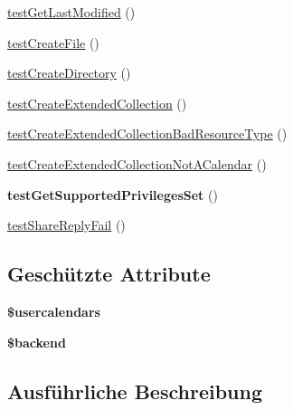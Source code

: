 \begin{DoxyCompactItemize}
\mbox{\hyperlink{class_sabre_1_1_cal_d_a_v_1_1_calendar_home_test_a5e5d7913351355e42699e250323a64b5}{test\+Get\+Last\+Modified}} ()
\item 
\mbox{\hyperlink{class_sabre_1_1_cal_d_a_v_1_1_calendar_home_test_a5d84b5ae7c7179597cc108cde18c2c60}{test\+Create\+File}} ()
\item 
\mbox{\hyperlink{class_sabre_1_1_cal_d_a_v_1_1_calendar_home_test_afdff8a5920b145232663ee478881207f}{test\+Create\+Directory}} ()
\item 
\mbox{\hyperlink{class_sabre_1_1_cal_d_a_v_1_1_calendar_home_test_a55126f5aa824a2a1feb6b6fdcfc914ba}{test\+Create\+Extended\+Collection}} ()
\item 
\mbox{\hyperlink{class_sabre_1_1_cal_d_a_v_1_1_calendar_home_test_a40765accd953fb435a7d655d28da4fc3}{test\+Create\+Extended\+Collection\+Bad\+Resource\+Type}} ()
\item 
\mbox{\hyperlink{class_sabre_1_1_cal_d_a_v_1_1_calendar_home_test_ad3040c2d52c0120443b4bd6a06ebf225}{test\+Create\+Extended\+Collection\+Not\+A\+Calendar}} ()
\item 
\mbox{\label{class_sabre_1_1_cal_d_a_v_1_1_calendar_home_test_aca714f3650bf61e1706f468e43c1b155}} 
{\bfseries test\+Get\+Supported\+Privileges\+Set} ()
\item 
\mbox{\hyperlink{class_sabre_1_1_cal_d_a_v_1_1_calendar_home_test_a28111b39aecc9693ef1e5a568d0110fe}{test\+Share\+Reply\+Fail}} ()
\end{DoxyCompactItemize}
\subsection*{Geschützte Attribute}
\begin{DoxyCompactItemize}
\item 
\mbox{\label{class_sabre_1_1_cal_d_a_v_1_1_calendar_home_test_aeacad9241c82e5af657a7014c293009f}} 
{\bfseries \$usercalendars}
\item 
\mbox{\label{class_sabre_1_1_cal_d_a_v_1_1_calendar_home_test_a69b6965e6b53c37614beb060141bda0b}} 
{\bfseries \$backend}
\end{DoxyCompactItemize}


\subsection{Ausführliche Beschreibung}


